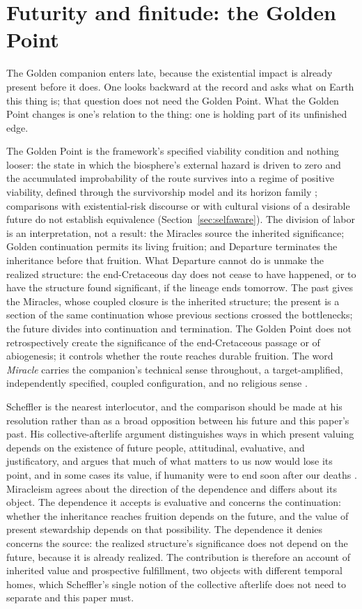 \section{Futurity and finitude: the Golden Point}\label{sec:golden}

The Golden companion enters late, because the existential impact is already
present before it does. One looks backward at the record and asks what on
Earth this thing is; that question does not need the Golden Point. What the
Golden Point changes is one's relation to the thing: one is holding part of
its unfinished edge.

The Golden Point is the framework's specified viability condition and nothing
looser: the state in which the biosphere's external hazard is driven to zero
and the accumulated improbability of the route survives into a regime of
positive viability, defined through the survivorship model and its horizon
family \cite{GoldenSurvivorship,GoldenRouteWorld}; comparisons with
existential-risk discourse or with cultural visions of a desirable future do
not establish equivalence (Section~\ref{sec:selfaware}). The division of
labor is an interpretation, not a result: the Miracles source the inherited
significance; Golden continuation permits
its living fruition; and Departure terminates the inheritance before that
fruition. What Departure cannot do is unmake the realized structure: the
end-Cretaceous day does not cease to have happened, or to have the structure
found significant, if the lineage ends tomorrow. The past gives the Miracles,
whose coupled closure is the inherited structure; the present is a section of
the same continuation whose previous sections crossed the bottlenecks; the
future divides into continuation and termination. The Golden Point does not
retrospectively create the significance of the end-Cretaceous passage or of
abiogenesis; it controls whether the route reaches durable fruition. The word \emph{Miracle} carries the companion's
technical sense throughout, a target-amplified, independently specified,
coupled configuration, and no religious sense \cite{GoldenRouteWorld}.

Scheffler is the nearest interlocutor, and the comparison should be made at
his resolution rather than as a broad opposition between his future and this
paper's past. His collective-afterlife argument distinguishes ways in which
present valuing depends on the existence of future people, attitudinal,
evaluative, and justificatory, and argues that much of what matters to us now
would lose its point, and in some cases its value, if humanity were to end
soon after our deaths \cite{Scheffler13}. Miracleism agrees about the
direction of the dependence and differs about its object. The dependence it
accepts is evaluative and concerns the continuation: whether the inheritance
reaches fruition depends on the future, and the value of present stewardship
depends on that possibility. The dependence it denies concerns the source: the
realized structure's significance does not depend on the future, because it is
already realized. The contribution is therefore an account of inherited value
and prospective fulfillment, two objects with different temporal homes, which
Scheffler's single notion of the collective afterlife does not need to
separate and this paper must.

